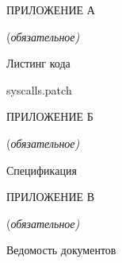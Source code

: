 \newpage
\centerline{ПРИЛОЖЕНИЕ А}
\centerline{(\it{обязательное})}
\centerline{Листинг кода}
\label{sec:appendix_a}

\vspace{\baselineskip}
\centerline{syscalls.patch}
\vspace{\baselineskip}



\newpage
\centerline{ПРИЛОЖЕНИЕ Б}
\centerline{(\it{обязательное})}
\centerline{Спецификация}
\label{sec:appendix_b}

\newpage
\centerline{ПРИЛОЖЕНИЕ В}
\centerline{(\it{обязательное})}
\centerline{Ведомость документов}
\label{sec:appendix_c}
